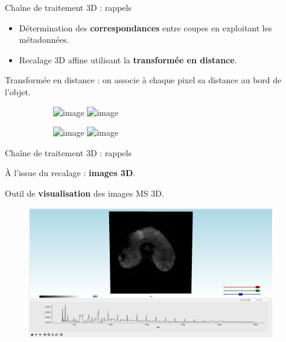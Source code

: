 \documentclass[10pt]{beamer}
\begin{document}
\begin{frame}{Chaîne de traitement 3D : rappels}
  \begin{itemize}
  \item Détermination des \textbf{correspondances} entre coupes en exploitant les métadonnées.
  \item<2-> Recalage 3D affine utilisant la \textbf{transformée en distance}.
  \end{itemize}

   {
    \alert{Transformée en distance} : on associe à chaque pixel sa distance au bord de l'objet.

    \begin{figure}[ht]
      \centering
      \begin{subfigure}[t]{0.5\textwidth}
        \centering
        \includegraphics<2>[width=0.65\textwidth]{fig/mri_slice6.png}%
        \includegraphics<3>[width=0.65\textwidth]{fig/mri_slice6_dt.png}
        \caption{}
        \label{subfig:mri_slice6_dt.png}
      \end{subfigure}%
      \begin{subfigure}[t]{0.5\textwidth}
        \centering
        \includegraphics<2>[width=0.65\textwidth]{fig/maldi_slice6.png}%
        \includegraphics<3>[width=0.65\textwidth]{fig/maldi_slice6_dt.png}
        \caption{}
        \label{subfig:maldi_slice6_dt.png}
      \end{subfigure}%
    \end{figure}
  }
\end{frame}

\begin{frame}{Chaîne de traitement 3D : rappels}

  À l'issue du recalage : \textbf{images 3D}.

  Outil de \textbf{visualisation} des images MS 3D.

  \begin{figure}[ht]
    \centering
    \includegraphics[width=0.95\textwidth]{fig/visu}%
    \caption{}
    \label{fig:visu}
  \end{figure}


\end{frame}
\end{document}
